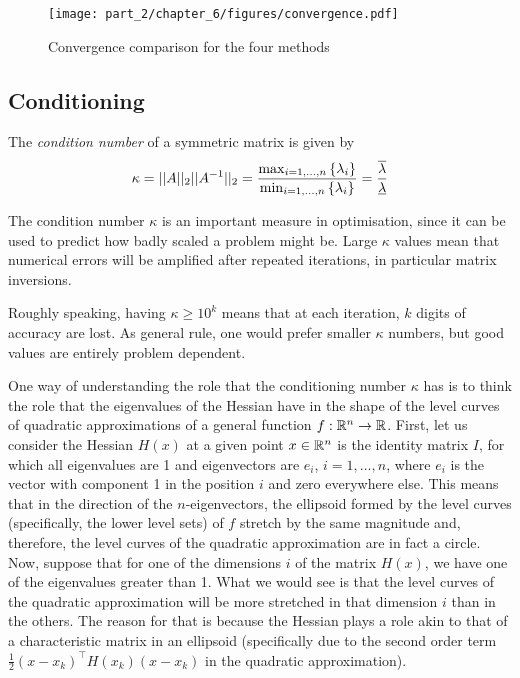 \begin{figure}
	\texttt{[image: part\_2/chapter\_6/figures/convergence.pdf]}
	\caption{Convergence comparison for the four methods}\label{fig:convergence}
\end{figure}


\subsection{Conditioning}

The \emph{condition number} of a symmetric matrix is given by 
\begin{align*}
	\kappa = ||A||_2 ||A^{-1}||_2 = \frac{\max_{i = 1,\dots,n} \left\{ \lambda_i \right \}}{\min_{i = 1,\dots,n} \left\{ \lambda_i \right \}} = \frac{\overline{\lambda}}{\underline{\lambda}}	
\end{align*}

The condition number $\kappa$ is an important measure in optimisation, since it can be used to predict how badly scaled a problem might be. Large $\kappa$ values mean that numerical errors will be amplified after repeated iterations, in particular matrix inversions.

Roughly speaking, having $\kappa \geq 10^k$ means that at each iteration, $k$ digits of accuracy are lost. As general rule, one would prefer smaller $\kappa$ numbers, but good values are entirely problem dependent. 

One way of understanding the role that the conditioning number $\kappa$ has is to think the role that the eigenvalues of the Hessian have in the shape of the level curves of quadratic approximations of a general function $f : \mathbb{R}^n \to \mathbb{R}$. First, let us consider the Hessian $H(x)$ at a given point $x \in \mathbb{R}^n$ is the identity matrix $I$, for which all eigenvalues are 1 and eigenvectors are $e_i$, $i = 1, \dots, n$, where $e_i$ is the vector with component 1 in the position $i$ and zero everywhere else. This means that in the direction of the $n$-eigenvectors, the ellipsoid formed by the level curves (specifically, the lower level sets) of $f$ stretch by the same magnitude and, therefore, the level curves of the quadratic approximation are in fact a circle. Now, suppose that for one of the dimensions $i$ of the matrix $H(x)$, we have one of the eigenvalues greater than 1. What we would see is that the level curves of the quadratic approximation will be more stretched in that dimension $i$ than in the others. The reason for that is because the Hessian plays a role akin to that of a characteristic matrix in an ellipsoid (specifically due to the second order term $\frac{1}{2}(x - x_k)^\top H(x_k)(x - x_k)$ in the quadratic approximation). 


